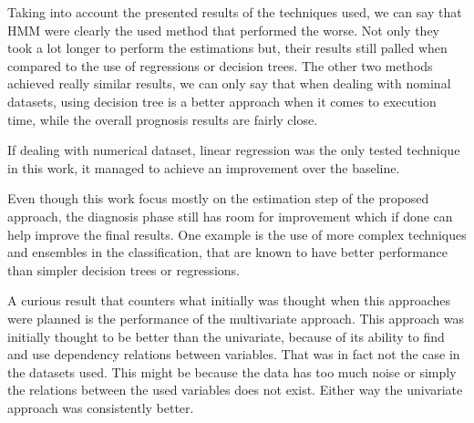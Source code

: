  Taking into account the presented results of the techniques used, we can say that HMM were clearly the used method that performed
  the worse. Not only they took a lot longer to perform the estimations but, their results still palled when compared to the use of 
  regressions or decision trees. The other two methods achieved really similar results, we can only say that when dealing with nominal
  datasets, using decision tree is a better approach when it comes to execution time, while the overall prognosis results are fairly close. 
  
  If dealing with numerical dataset, linear regression was the only tested technique in this work, it managed to achieve an improvement 
  over the baseline.
  
  Even though this work focus mostly on the estimation step of the proposed approach, the diagnosis phase still has room for improvement which if done can help improve the final results. One example is the use of more complex techniques and ensembles in the classification, that are known to have better performance than simpler decision trees or regressions.
  
  A curious result that counters what initially was thought when this approaches were planned is the performance of the multivariate approach. This approach was initially thought to be better than the univariate, because of its ability to find and use dependency relations between variables. That was in fact not the case in the datasets used. This might be because the data has too much noise or simply the relations between the used variables does not exist. Either way the univariate approach was consistently better.
 
 
\cleardoublepage
